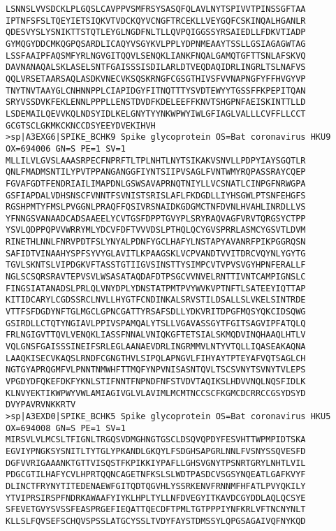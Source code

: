 \documentclass[en,black,12pt,normal]{elegantnote}
\begin{document}
\begin{lstlisting}
LSNNSLVVSDCKLPLGQSLCAVPPVSMFRSYSASQFQLAVLNYTSPIVVTPINSSGFTAA
IPTNFSFSLTQEYIETSIQKVTVDCKQYVCNGFTRCEKLLVEYGQFCSKINQALHGANLR
QDESVYSLYSNIKTTSTQTLEYGLNGDFNLTLLQVPQIGGSSYRSAIEDLLFDKVTIADP
GYMQGYDDCMKQGPQSARDLICAQYVSGYKVLPPLYDPNMEAAYTSSLLGSIAGAGWTAG
LSSFAAIPFAQSMFYRLNGVGITQQVLSENQKLIANKFNQALGAMQTGFTTSNLAFSKVQ
DAVNANAQALSKLASELSNTFGAISSSISDILARLDTVEQDAQIDRLINGRLTSLNAFVS
QQLVRSETAARSAQLASDKVNECVKSQSKRNGFCGSGTHIVSFVVNAPNGFYFFHVGYVP
TNYTNVTAAYGLCNHNNPPLCIAPIDGYFITNQTTTYSVDTEWYYTGSSFFKPEPITQAN
SRYVSSDVKFEKLENNLPPPLLENSTDVDFKDELEEFFKNVTSHGPNFAEISKINTTLLD
LSDEMAILQEVVKQLNDSYIDLKELGNYTYYNKWPWYIWLGFIAGLVALLLCVFFLLCCT
GCGTSCLGKMKCKNCCDSYEEYDVEKIHVH
>sp|A3EXG6|SPIKE_BCHK9 Spike glycoprotein OS=Bat coronavirus HKU9 OX=694006 GN=S PE=1 SV=1
MLLILVLGVSLAAASRPECFNPRFTLTPLNHTLNYTSIKAKVSNVLLPDPYIAYSGQTLR
QNLFMADMSNTILYPVTPPANGANGGFIYNTSIIPVSAGLFVNTWMYRQPASSRAYCQEP
FGVAFGDTFENDRIAILIMAPDNLGSWSAVAPRNQTNIYLLVCSNATLCINPGFNRWGPA
GSFIAPDALVDHSNSCFVNNTFSVNISTSRISLAFLFKDGDLLIYHSGWLPTSNFEHGFS
RGSHPMTYFMSLPVGGNLPRAQFFQSIVRSNAIDKGDGMCTNFDVNLHVAHLINRDLLVS
YFNNGSVANAADCADSAAEELYCVTGSFDPPTGVYPLSRYRAQVAGFVRVTQRGSYCTPP
YSVLQDPPQPVVWRRYMLYDCVFDFTVVVDSLPTHQLQCYGVSPRRLASMCYGSVTLDVM
RINETHLNNLFNRVPDTFSLYNYALPDNFYGCLHAFYLNSTAPYAVANRFPIKPGGRQSN
SAFIDTVINAAHYSPFSYVYGLAVITLKPAAGSKLVCPVANDTVVITDRCVQYNLYGYTG
TGVLSKNTSLVIPDGKVFTASSTGTIIGVSINSTTYSIMPCVTVPVSVGYHPNFERALLF
NGLSCSQRSRAVTEPVSVLWSASATAQDAFDTPSGCVVNVELRNTTIVNTCAMPIGNSLC
FINGSIATANADSLPRLQLVNYDPLYDNSTATPMTPVYWVKVPTNFTLSATEEYIQTTAP
KITIDCARYLCGDSSRCLNVLLHYGTFCNDINKALSRVSTILDSALLSLVKELSINTRDE
VTTFSFDGDYNFTGLMGCLGPNCGATTYRSAFSDLLYDKVRITDPGFMQSYQKCIDSQWG
GSIRDLLCTQTYNGIAVLPPIVSPAMQALYTSLLVGAVASSGYTFGITSAGVIPFATQLQ
FRLNGIGVTTQVLVENQKLIASSFNNALVNIQKGFTETSIALSKMQDVINQHAAQLHTLV
VQLGNSFGAISSSINEIFSRLEGLAANAEVDRLINGRMMVLNTYVTQLLIQASEAKAQNA
LAAQKISECVKAQSLRNDFCGNGTHVLSIPQLAPNGVLFIHYAYTPTEYAFVQTSAGLCH
NGTGYAPRQGMFVLPNNTNMWHFTTMQFYNPVNISASNTQVLTSCSVNYTSVNYTVLEPS
VPGDYDFQKEFDKFYKNLSTIFNNTFNPNDFNFSTVDVTAQIKSLHDVVNQLNQSFIDLK
KLNVYEKTIKWPWYVWLAMIAGIVGLVLAVIMLMCMTNCCSCFKGMCDCRRCCGSYDSYD
DVYPAVRVNKKRTV
>sp|A3EXD0|SPIKE_BCHK5 Spike glycoprotein OS=Bat coronavirus HKU5 OX=694008 GN=S PE=1 SV=1
MIRSVLVLMCSLTFIGNLTRGQSVDMGHNGTGSCLDSQVQPDYFESVHTTWPMPIDTSKA
EGVIYPNGKSYSNITLTYTGLYPKANDLGKQYLFSDGHSAPGRLNNLFVSNYSSQVESFD
DGFVVRIGAAANKTGTTVISQSTFKPIKKIYPAFLLGHSVGNYTPSNRTGRYLNHTLVIL
PDGCGTILHAFYCVLHPRTQQNCAGETNFKSLSLWDTPASDCVSGSYNQEATLGAFKVYF
DLINCTFRYNYTITEDENAEWFGITQDTQGVHLYSSRKENVFRNNMFHFATLPVYQKILY
YTVIPRSIRSPFNDRKAWAAFYIYKLHPLTYLLNFDVEGYITKAVDCGYDDLAQLQCSYE
SFEVETGVYSVSSFEASPRGEFIEQATTQECDFTPMLTGTPPPIYNFKRLVFTNCNYNLT
KLLSLFQVSEFSCHQVSPSSLATGCYSSLTVDYFAYSTDMSSYLQPGSAGAIVQFNYKQD

\end{lstlisting}
\end{document}
